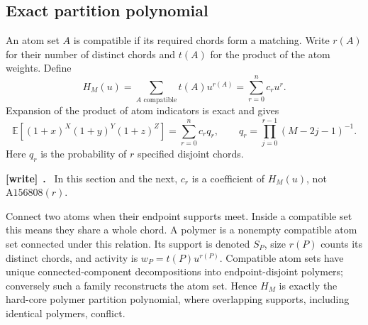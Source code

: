 \documentclass[11pt,letterpaper]{article}
\numberwithin{equation}{section}
\theoremstyle{definition}\newtheorem{definition}[theorem]{Definition}
\theoremstyle{remark}\newtheorem{remark}[theorem]{Remark}
\newcommand{\EE}{\mathbb E}
\newenvironment{writenote}[1][]{\par\smallskip\begingroup\small
 \noindent\textbf{[write]}\if\relax\detokenize{#1}\relax\else~\textbf{#1.}\fi\ }%
 {\par\endgroup\smallskip}
\begin{document}
\subsection{Exact partition polynomial}
An atom set $A$ is compatible if its required chords form a
matching. Write $r(A)$ for their number of distinct chords and
$t(A)$ for the product of the atom weights. Define
\begin{equation}\label{cgr:fc:eq:partition}
 H_M(u)=\sum_{A\text{ compatible}}t(A)u^{r(A)}
       =\sum_{r=0}^{n}c_r u^r.
\end{equation}
Expansion of the product of atom indicators is exact and gives
\begin{equation}\label{cgr:fc:eq:matching-exact}
 \EE[(1+x)^X(1+y)^Y(1+z)^Z]=\sum_{r=0}^{n}c_rq_r,
 \qquad q_r=\prod_{j=0}^{r-1}(M-2j-1)^{-1}.
\end{equation}
Here $q_r$ is the probability of $r$ specified disjoint chords.
\begin{writenote}
In this section and the next, $c_r$ is a coefficient of $H_M(u)$, not $\mathrm{A156808}(r)$.
\end{writenote}

Connect two atoms when their endpoint supports meet. Inside a
compatible set this means they share a whole chord. A polymer is
a nonempty compatible atom set connected under this relation. Its
support is denoted $S_P$, size $r(P)$ counts its distinct chords,
and activity is $w_P=t(P)u^{r(P)}$. Compatible atom sets have unique
connected-component decompositions into endpoint-disjoint polymers;
conversely such a family reconstructs the atom set. Hence
$H_M$ is exactly the hard-core polymer partition polynomial,
where overlapping supports, including identical polymers, conflict.
\end{document}
